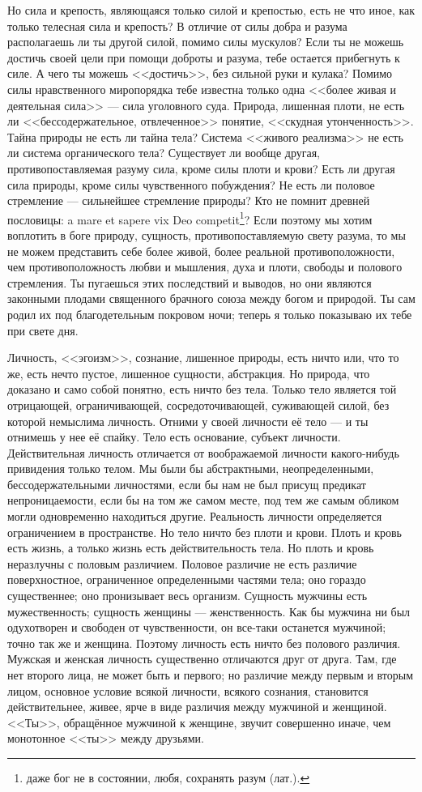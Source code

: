 \documentclass[12pt,oneside]{book}
\begin{document}
Но сила и крепость, являющаяся только силой и крепостью, есть не что иное, как только телесная сила и крепость? В отличие от силы добра и разума располагаешь ли ты другой силой, помимо силы мускулов? Если ты не можешь достичь своей цели при помощи доброты и разума, тебе остается прибегнуть к силе. А чего ты можешь <<достичь>>, без сильной руки и кулака? Помимо силы нравственного миропорядка тебе известна только одна <<более живая и деятельная сила>> --- сила уголовного суда. Природа, лишенная плоти, не есть ли <<бессодержательное, отвлеченное>> понятие, <<скудная утонченность>>. Тайна природы не есть ли тайна тела? Система <<живого реализма>> не есть ли система органического тела? Существует ли вообще другая, противопоставляемая разуму сила, кроме силы плоти и крови? Есть ли другая сила природы, кроме силы чувственного побуждения? Не есть ли половое стремление --- сильнейшее стремление природы? Кто не помнит древней пословицы: a mare et sapere vix Deo competit\footnote{даже бог не в состоянии, любя, сохранять разум (лат.).}? Если поэтому мы хотим воплотить в боге природу, сущность, противопоставляемую свету разума, то мы не можем представить себе более живой, более реальной противоположности, чем противоположность любви и мышления, духа и плоти, свободы и полового стремления. Ты пугаешься этих последствий и выводов, но они являются законными плодами священного брачного союза между богом и природой. Ты сам родил их под благодетельным покровом ночи; теперь я только показываю их тебе при свете дня.

Личность, <<эгоизм>>, сознание, лишенное природы, есть ничто или, что то же, есть нечто пустое, лишенное сущности, абстракция. Но природа, что доказано и само собой понятно, есть ничто без тела. Только тело является той отрицающей, ограничивающей, сосредоточивающей, суживающей силой, без которой немыслима личность. Отними у своей личности её тело --- и ты отнимешь у нее её спайку. Тело есть основание, субъект личности. Действительная личность отличается от воображаемой личности какого-нибудь привидения только телом. Мы были бы абстрактными, неопределенными, бессодержательными личностями, если бы нам не был присущ предикат непроницаемости, если бы на том же самом месте, под тем же самым обликом могли одновременно находиться другие. Реальность личности определяется ограничением в пространстве. Но тело ничто без плоти и крови. Плоть и кровь есть жизнь, а только жизнь есть действительность тела. Но плоть и кровь неразлучны с половым различием. Половое различие не есть различие поверхностное, ограниченное определенными частями тела; оно гораздо существеннее; оно пронизывает весь организм. Сущность мужчины есть мужественность; сущность женщины --- женственность. Как бы мужчина ни был одухотворен и свободен от чувственности, он все-таки останется мужчиной; точно так же и женщина. Поэтому личность есть ничто без полового различия. Мужская и женская личность существенно отличаются друг от друга. Там, где нет второго лица, не может быть и первого; но различие между первым и вторым лицом, основное условие всякой личности, всякого сознания, становится действительнее, живее, ярче в виде различия между мужчиной и женщиной. <<Ты>>, обращённое мужчиной к женщине, звучит совершенно иначе, чем монотонное <<ты>> между друзьями.
\end{document}
